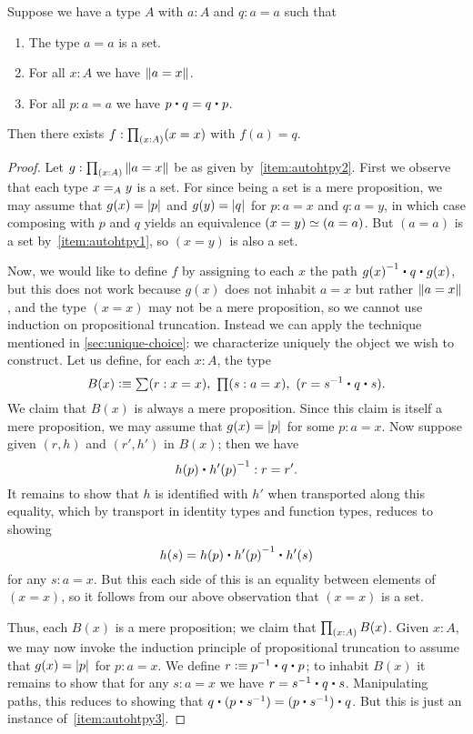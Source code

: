 \begin{lem}\label{lem:autohtpy}
  Suppose we have a type $A$ with $a:A$ and $q:a=a$ such that
  \begin{enumerate}
  \item The type $a=a$ is a set.\label{item:autohtpy1}
  \item For all $x:A$ we have $\brck{a=x}$.\label{item:autohtpy2}
  \item For all $p:a=a$ we have $p\ct q = q \ct p$.\label{item:autohtpy3}
  \end{enumerate}
  Then there exists $f:\prd{x:A} (x=x)$ with $f(a)=q$.
\end{lem}
\begin{proof}
  Let $g:\prd{x:A} \brck{a=x}$ be as given by~\ref{item:autohtpy2}.
  First we observe that each type $\id[A]xy$ is a set.
  For since being a set is a mere proposition, we may assume that $g(x)=\bproj p$ and $g(y)=\bproj q$ for $p:a=x$ and $q:a=y$, in which case composing with $p$ and $q$ yields an equivalence $\eqv{(x=y)}{(a=a)}$.
  But $(a=a)$ is a set by~\ref{item:autohtpy1}, so $(x=y)$ is also a set.

  Now, we would like to define $f$ by assigning to each $x$ the path $\opp{g(x)} \ct q \ct g(x)$, but this does not work because $g(x)$ does not inhabit $a=x$ but rather $\brck{a=x}$, and the type $(x=x)$ may not be a mere proposition, so we cannot use induction on propositional truncation.
  Instead we can apply the technique mentioned in \autoref{sec:unique-choice}: we characterize uniquely the object we wish to construct.
  Let us define, for each $x:A$, the type
  \[ B(x) \defeq \sm{r:x=x} \prd{s:a=x} (r = \opp s \ct q\ct s) .\]
  We claim that $B(x)$ is always a mere proposition.
  Since this claim is itself a mere proposition, we may assume that $g(x) = \bproj p$ for some $p:a=x$.
  Now suppose given $(r,h)$ and $(r',h')$ in $B(x)$; then we have
  \[ h(p) \ct \opp{h'(p)} : r = r'. \]
  It remains to show that $h$ is identified with $h'$ when transported along this equality, which by transport in identity types and function types, reduces to showing
  \[ h(s) = h(p) \ct \opp{h'(p)} \ct h'(s) \]
  for any $s:a=x$.
  But this each side of this is an equality between elements of $(x=x)$, so it follows from our above observation that $(x=x)$ is a set.

  Thus, each $B(x)$ is a mere proposition; we claim that $\prd{x:A} B(x)$.
  Given $x:A$, we may now invoke the induction principle of propositional truncation to assume that $g(x) = \bproj p$ for $p:a=x$.
  We define $r \defeq \opp p \ct q \ct p$; to inhabit $B(x)$ it remains to show that for any $s:a=x$ we have
  $r = \opp s \ct q \ct s$.
  Manipulating paths, this reduces to showing that $q\ct (p\ct \opp s) = (p\ct \opp s) \ct q$.
  But this is just an instance of~\ref{item:autohtpy3}.
\end{proof}

